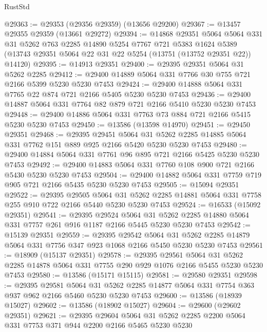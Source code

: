 \begin{lexlean}{RustStd}
\begin{coremodule}
@29363 := @29353 (@29356 @29359) (@13656 @29200)
@29367 := @13457 @29355 @29359 (@13661 @29272)
@29394 := @14868
    @29351
    @5064
    @5064
    @331
    @31
    @5262
    @763
    @2285
    @14890
    @5254
    @7767
    @721
    @5383
    @1624
    @5389
    (@13743 @29351 @5064 @22 @31 @22 @5254 (@13751 (@13752 @29351 @22)) @14120)
@29395 := @14913 @29351
@29400 := @29395 @29351 @5064 @31 @5262 @2285
@29412 := @29400 @14889 @5064 @331 @7766 @30 @755 @721 @2166 @5399 @5230 @5230 @7453
@29424 := @29400 @14888 @5064 @331 @7765 @22 @874 @721 @2166 @5405 @5230 @5230 @7453
@29436 := @29400 @14887 @5064 @331 @7764 @82 @879 @721 @2166 @5410 @5230 @5230 @7453
@29448 := @29400 @14886 @5064 @331 @7763 @73 @884 @721 @2166 @5415 @5230 @5230 @7453
@29450 := @13586 (@13598 @14970)
@29451 := @29450 @29351
@29468 := @29395
    @29451
    @5064
    @31
    @5262
    @2285
    @14885
    @5064
    @331
    @7762
    @151
    @889
    @925
    @2166
    @5420
    @5230
    @5230
    @7453
@29480 := @29400 @14884 @5064 @331 @7761 @96 @895 @721 @2166 @5425 @5230 @5230 @7453
@29492 := @29400 @14883 @5064 @331 @7760 @108 @900 @721 @2166 @5430 @5230 @5230 @7453
@29504 := @29400 @14882 @5064 @331 @7759 @719 @905 @721 @2166 @5435 @5230 @5230 @7453
@29505 := @15094 @29351
@29522 := @29395
    @29505
    @5064
    @31
    @5262
    @2285
    @14881
    @5064
    @331
    @7758
    @255
    @910
    @722
    @2166
    @5440
    @5230
    @5230
    @7453
@29524 := @16533 (@15092 @29351)
@29541 := @29395
    @29524
    @5064
    @31
    @5262
    @2285
    @14880
    @5064
    @331
    @7757
    @261
    @916
    @1187
    @2166
    @5445
    @5230
    @5230
    @7453
@29542 := @15139 @29351
@29559 := @29395
    @29542
    @5064
    @31
    @5262
    @2285
    @14879
    @5064
    @331
    @7756
    @347
    @923
    @1068
    @2166
    @5450
    @5230
    @5230
    @7453
@29561 := @18909 (@15137 @29351)
@29578 := @29395
    @29561
    @5064
    @31
    @5262
    @2285
    @14878
    @5064
    @331
    @7755
    @290
    @929
    @1076
    @2166
    @5455
    @5230
    @5230
    @7453
@29580 := @13586 (@15171 @15115)
@29581 := @29580 @29351
@29598 := @29395
    @29581
    @5064
    @31
    @5262
    @2285
    @14877
    @5064
    @331
    @7754
    @363
    @937
    @962
    @2166
    @5460
    @5230
    @5230
    @7453
@29600 := @13586 (@18939 @15027)
@29602 := @13586 (@18902 @15027)
@29604 := @29600 (@29602 @29351)
@29621 := @29395
    @29604
    @5064
    @31
    @5262
    @2285
    @2200
    @5064
    @331
    @7753
    @371
    @944
    @2200
    @2166
    @5465
    @5230
    @5230

\end{coremodule}
\end{lexlean}
